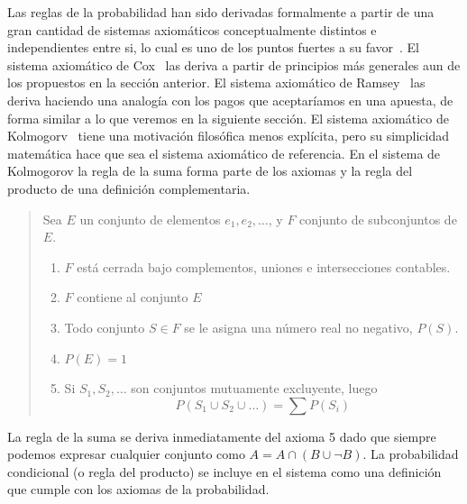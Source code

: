 \documentclass[a4paper,10pt]{book}
\theoremstyle{definition}
\begin{document}
Las reglas de la probabilidad han sido derivadas formalmente a partir de una gran cantidad de sistemas axiomáticos conceptualmente distintos e independientes entre si, lo cual es uno de los puntos fuertes a su favor~\cite{halpern2017}.
%
El sistema axiomático de Cox~\cite{cox} las deriva a partir de principios más generales aun de los propuestos en la sección anterior.
%
El sistema axiomático de Ramsey~\cite{ramsey} las deriva haciendo una analogía con los pagos que aceptaríamos en una apuesta, de forma similar a lo que veremos en la siguiente sección. 
%
El sistema axiomático de Kolmogorv~\cite{kolmogorov} tiene una motivación filosófica menos explícita, pero su simplicidad matemática hace que sea el sistema axiomático de referencia.
%
En el sistema de Kolmogorov la regla de la suma forma parte de los axiomas y la regla del producto de una definición complementaria.
%
\begin{quotation}
Sea $E$ un conjunto de elementos $e_1, e_2, \dots$, y $F$ conjunto de subconjuntos de $E$.
%
\begin{enumerate}\itemsep-0.05cm
\item $F$ está cerrada bajo complementos, uniones e intersecciones contables.
\item $F$ contiene al conjunto $E$
\item Todo conjunto $S \in F$ se le asigna una número real no negativo, $P(S)$.
\item $P(E) = 1$
\item Si $S_1, S_2, \dots$ son conjuntos mutuamente excluyente, luego
\begin{equation}
P(S_1 \cup S_2 \cup \dots ) = \sum P(S_i)
\end{equation}
\end{enumerate}
\end{quotation}
%
La regla de la suma se deriva inmediatamente del axioma 5 dado que siempre podemos expresar cualquier conjunto como $A = A \cap (B \cup \neg B)$.
%
La probabilidad condicional (o regla del producto) se incluye en el sistema como una definición que cumple con los axiomas de la probabilidad. 

\end{document}
